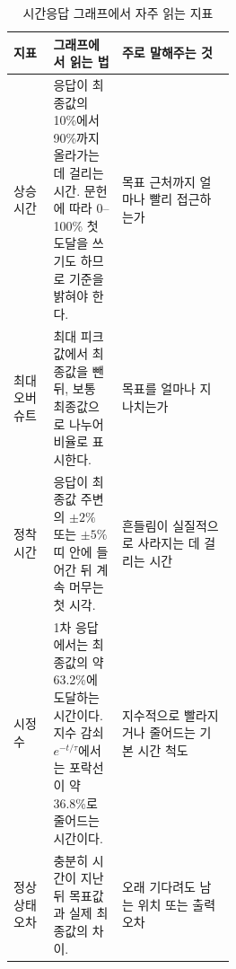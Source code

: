 \begin{table}[!htbp]
  \centering
  \caption{시간응답 그래프에서 자주 읽는 지표}
  \small
  \setlength{\tabcolsep}{4pt}
  \begin{tabularx}{\linewidth}{@{}>{\raggedright\arraybackslash}p{0.18\linewidth}>{\raggedright\arraybackslash}p{0.31\linewidth}>{\raggedright\arraybackslash}X@{}}
    \toprule
    지표 & 그래프에서 읽는 법 & 주로 말해주는 것 \\
    \midrule
    상승시간 & 응답이 최종값의 10\%에서 90\%까지 올라가는 데 걸리는 시간. 문헌에 따라 0--100\% 첫 도달을 쓰기도 하므로 기준을 밝혀야 한다. & 목표 근처까지 얼마나 빨리 접근하는가 \\
    최대 오버슈트 & 최대 피크값에서 최종값을 뺀 뒤, 보통 최종값으로 나누어 비율로 표시한다. & 목표를 얼마나 지나치는가 \\
    정착시간 & 응답이 최종값 주변의 $\pm2\%$ 또는 $\pm5\%$ 띠 안에 들어간 뒤 계속 머무는 첫 시각. & 흔들림이 실질적으로 사라지는 데 걸리는 시간 \\
    시정수 & 1차 응답에서는 최종값의 약 63.2\%에 도달하는 시간이다. 지수 감쇠 $e^{-t/\tau}$에서는 포락선이 약 36.8\%로 줄어드는 시간이다. & 지수적으로 빨라지거나 줄어드는 기본 시간 척도 \\
    정상상태 오차 & 충분히 시간이 지난 뒤 목표값과 실제 최종값의 차이. & 오래 기다려도 남는 위치 또는 출력 오차 \\
    \bottomrule
  \end{tabularx}
\end{table}


